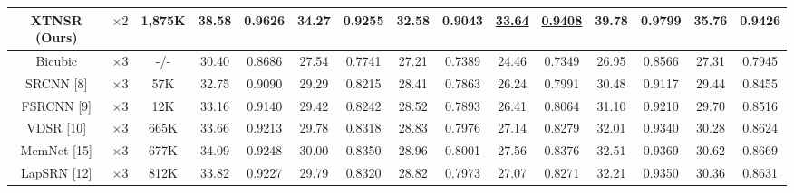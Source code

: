 \documentclass[twocolumn]{svjour3}          %
\begin{document}
\begin{table}
\begin{tabular}{|c|c|c|cc|cc|cc|cc|cc|cc|}
XTNSR (Ours) & $\times 2$ &1,875K& \multicolumn{1}{c|}{\color{red}\textbf{38.58}} &{\color{red}\textbf{0.9626}} & \multicolumn{1}{c|}{\color{red}\textbf{34.27} } &{\color{red}\textbf{ 0.9255}} & \multicolumn{1}{c|}{\color{red}\textbf{32.58}} &{\color{red}\textbf{0.9043}}& \multicolumn{1}{c|}{\color{blue}\underline{33.64}} &{\color{blue}\underline{0.9408}}& \multicolumn{1}{c|}{\color{red}\textbf{39.78}} &{\color{red}\textbf{0.9799}} &\multicolumn{1}{c|}{\color{red}\textbf{35.76}} & {\color{red}\textbf{0.9426}}\\
\hline

Bicubic&$\times3$ &-/-& \multicolumn{1}{c|}{30.40} & 0.8686  & \multicolumn{1}{c|}{27.54} & 0.7741 & \multicolumn{1}{c|}{27.21} & 0.7389 & \multicolumn{1}{c|}{24.46} & 0.7349  & \multicolumn{1}{c|}{26.95} &0.8566
&\multicolumn{1}{c|}{27.31} & 0.7945\\

SRCNN [8] & $\times3$ & 57K&\multicolumn{1}{c|}{32.75} & 0.9090  & \multicolumn{1}{c|}{29.29} & 0.8215  &\multicolumn{1}{c|}{28.41} & 0.7863  & \multicolumn{1}{c|}{26.24} &0.7991 & \multicolumn{1}{c|}{30.48} &0.9117
&\multicolumn{1}{c|}{29.44} & 0.8455\\

FSRCNN [9]& $\times3$ &12K& \multicolumn{1}{c|}{33.16} &0.9140& \multicolumn{1}{c|}{29.42} & 0.8242 &\multicolumn{1}{c|}{28.52} & 0.7893& \multicolumn{1}{c|}{26.41} &0.8064& \multicolumn{1}{c|}{31.10} &0.9210
&\multicolumn{1}{c|}{29.70} & 0.8516\\

VDSR [10]& $\times3$ &665K& \multicolumn{1}{c|}{33.66} & 0.9213 & \multicolumn{1}{c|}{29.78} & 0.8318 &\multicolumn{1}{c|}{28.83} & 0.7976& \multicolumn{1}{c|}{27.14} & 0.8279 & \multicolumn{1}{c|}{32.01} & 0.9340
&\multicolumn{1}{c|}{30.28} & 0.8624\\

MemNet [15] & $\times3$ &677K& \multicolumn{1}{c|}{34.09} &0.9248  & \multicolumn{1}{c|}{30.00} &0.8350  &\multicolumn{1}{c|}{28.96} & 0.8001 & \multicolumn{1}{c|}{27.56} & 0.8376 & \multicolumn{1}{c|}{32.51} &0.9369
&\multicolumn{1}{c|}{ 30.62} &0.8669\\

LapSRN [12] &$\times3$ &812K& \multicolumn{1}{c|}{33.82} & 0.9227  & \multicolumn{1}{c|}{29.79} & 0.8320  &\multicolumn{1}{c|}{28.82} & 0.7973  & \multicolumn{1}{c|}{27.07} & 0.8271 & \multicolumn{1}{c|}{32.21} & 0.9350
&\multicolumn{1}{c|}{30.36} & 0.8631\\


\end{tabular}
\end{table}
\end{document}
